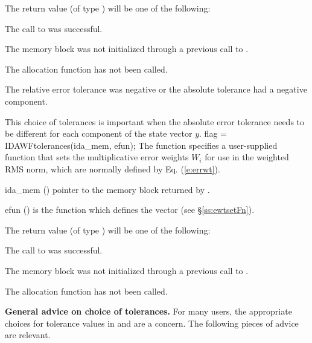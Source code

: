 {
  The return value  (of type ) will be one of the following:
  \begin{args}
  \item[\Id{IDA\_SUCCESS}]
    The call to  was successful.
  \item[\Id{IDA\_MEM\_NULL}] 
    The {\idas} memory block was not initialized through a previous call to
    .
  \item[\Id{IDA\_NO\_MALLOC}] 
    The allocation function  has not been called.
  \item[\Id{IDA\_ILL\_INPUT}] 
    The relative error tolerance was negative or the absolute tolerance
    had a negative component.
  \end{args}
}
{
  This choice of tolerances is important when the absolute error tolerance needs to
  be different for each component of the state vector $y$. 
}
{
  flag = IDAWFtolerances(ida\_mem, efun);
}
{
  The function  specifies a user-supplied function 
  that sets the multiplicative error weights $W_i$ for use in the weighted
  RMS norm, which are normally defined by Eq. (\ref{e:errwt}).
}
{
  \begin{args}
  \item[ida\_mem] ()
    pointer to the {\idas} memory block returned by .
  \item[efun] () 
    is the {\CC} function which defines the  vector (see
    \S\ref{ss:ewtsetFn}).
  \end{args}
}
{
  The return value  (of type ) will be one of the following:
  \begin{args}
  \item[\Id{IDA\_SUCCESS}]
    The call to  was successful.
  \item[\Id{IDA\_MEM\_NULL}] 
    The {\idas} memory block was not initialized through a previous call to
    .
  \item[\Id{IDA\_NO\_MALLOC}] 
    The allocation function  has not been called.
  \end{args}
}
{}

{\bf General advice on choice of tolerances.}
For many users, the appropriate choices for tolerance values in
 and  are a concern.  The following pieces of
advice are relevant.

